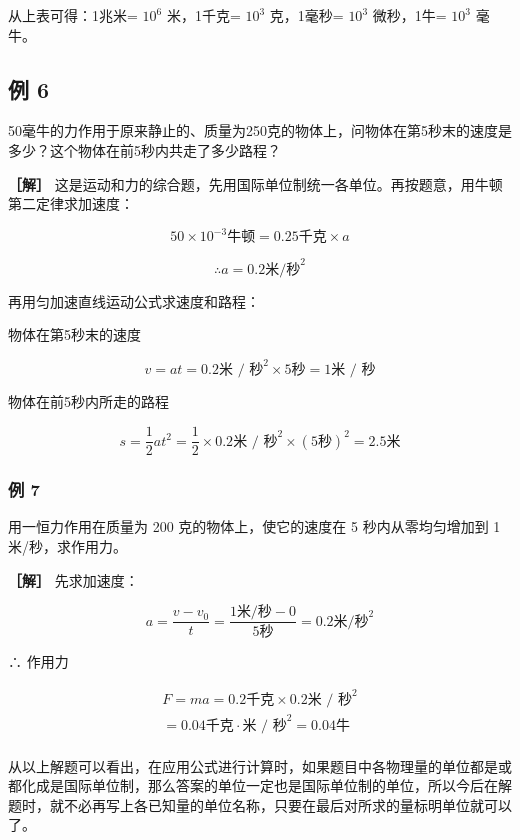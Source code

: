 从上表可得：1兆米= \(10^{6}\) 米，1千克= \(10^{3}\) 克，1毫秒=
\(10^{3}\) 微秒，1牛= \(10^{3}\) 毫牛。

\subsection{例 6}\label{ux4f8b-6-3}

50毫牛的力作用于原来静止的、质量为250克的物体上，问物体在第5秒末的速度是多少？这个物体在前5秒内共走了多少路程？

\textbf{［解］}
这是运动和力的综合题，先用国际单位制统一各单位。再按题意，用牛顿第二定律求加速度：

\[
50 \times 10 ^ {- 3} \text{牛顿} = 0.25 \text{千克} \times a
\]

\[
\therefore a = 0.2 \text{米} / \text{秒} ^ {2}
\]

再用匀加速直线运动公式求速度和路程：

物体在第5秒末的速度

\[
v = a t = 0.2 \text{米 / 秒} ^ {2} \times 5 \text{秒} = 1 \text{米 / 秒}
\]

物体在前5秒内所走的路程

\[
s = \frac {1}{2} a t ^ {2} = \frac {1}{2} \times 0.2 \text{米 / 秒} ^ {2} \times (5 \text{秒}) ^ {2} = 2.5 \text{米}
\]

\subsubsection{例 7}\label{ux4f8b-7-3}

用一恒力作用在质量为 200 克的物体上，使它的速度在 5 秒内从零均匀增加到 1
米/秒，求作用力。

\textbf{［解］} 先求加速度：

\[
a=\frac{v-v_{0}}{t} =\frac{1\text{米/秒}-0}{5\text{秒}} =0.2\text{米/秒}^{2}
\]

∴ 作用力

\[
\begin{array}{l} F = m a = 0.2 \text{千克} \times 0.2 \text{米 / 秒} ^ {2} \\ = 0.04 \text{千克} \cdot \text{米 / 秒} ^ {2} = 0.04 \text{牛} \\ \end{array}
\]

从以上解题可以看出，在应用公式进行计算时，如果题目中各物理量的单位都是或都化成是国际单位制，那么答案的单位一定也是国际单位制的单位，所以今后在解题时，就不必再写上各已知量的单位名称，只要在最后对所求的量标明单位就可以了。

